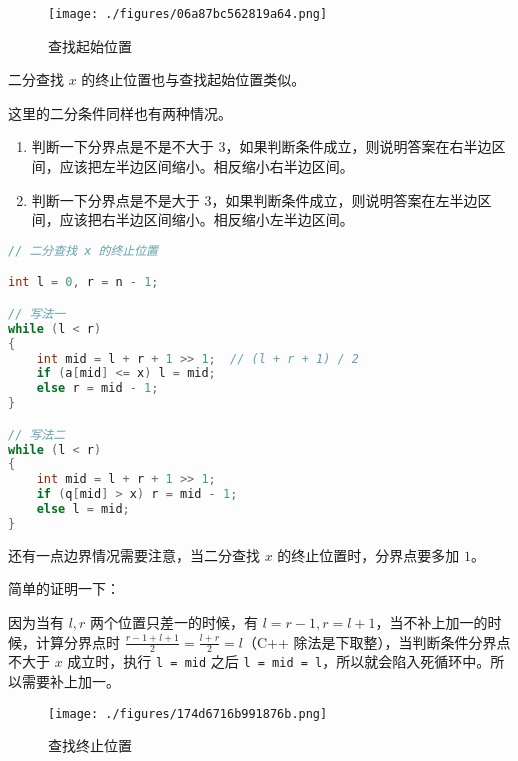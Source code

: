 \begin{figure}[ht]
\centering
\texttt{[image: ./figures/06a87bc562819a64.png]}
\caption{查找起始位置} \label{fig_BS_1}
\end{figure}


二分查找 $x$ 的终止位置也与查找起始位置类似。

这里的二分条件同样也有两种情况。

\begin{enumerate}
\item 判断一下分界点是不是不大于 $3$，如果判断条件成立，则说明答案在右半边区间，应该把左半边区间缩小。相反缩小右半边区间。
\item 判断一下分界点是不是大于 $3$，如果判断条件成立，则说明答案在左半边区间，应该把右半边区间缩小。相反缩小左半边区间。
\end{enumerate}
\begin{lstlisting}[language=cpp]
// 二分查找 x 的终止位置

int l = 0, r = n - 1;

// 写法一
while (l < r)
{
	int mid = l + r + 1 >> 1;  // (l + r + 1) / 2
    if (a[mid] <= x) l = mid;
    else r = mid - 1;
}

// 写法二
while (l < r)
{
    int mid = l + r + 1 >> 1;
    if (q[mid] > x) r = mid - 1;
    else l = mid;
}
\end{lstlisting}



还有一点边界情况需要注意，当二分查找 $x$ 的终止位置时，分界点要多加 $1$。

简单的证明一下：

因为当有 $l, r$ 两个位置只差一的时候，有 $l = r - 1, r = l + 1$，当不补上加一的时候，计算分界点时 $\frac{r - 1 + l + 1}{2} = \frac{l+r}{2}=l$（C++ 除法是下取整），当判断条件分界点不大于 $x$ 成立时，执行 \verb|l = mid| 之后 \verb|l = mid = l|，所以就会陷入死循环中。所以需要补上加一。

\begin{figure}[ht]
\centering
\texttt{[image: ./figures/174d6716b991876b.png]}
\caption{查找终止位置} \label{fig_BS_2}
\end{figure}
